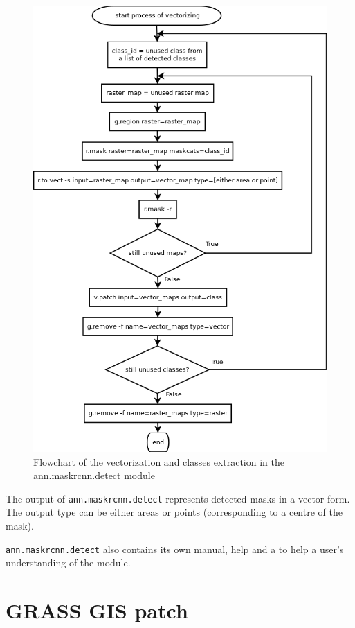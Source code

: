 \begin{figure}[H]
   \centering
	\includegraphics[width=0.95\linewidth]{./pictures/vectorize.png}
	\caption[vectorization in ann.maskrcnn.detect flowchart]{Flowchart of the vectorization and classes extraction in the ann.maskrcnn.detect module}
      \label{fig:vectorize}
\end{figure}

The output of \verb|ann.maskrcnn.detect| represents detected masks in a vector form. The output type can be either areas or points (corresponding to a centre of the mask).

\verb|ann.maskrcnn.detect| also contains its own manual, help and a  to 
help a user's understanding of the module.

\section{GRASS GIS patch}
\label{grass-patch}

